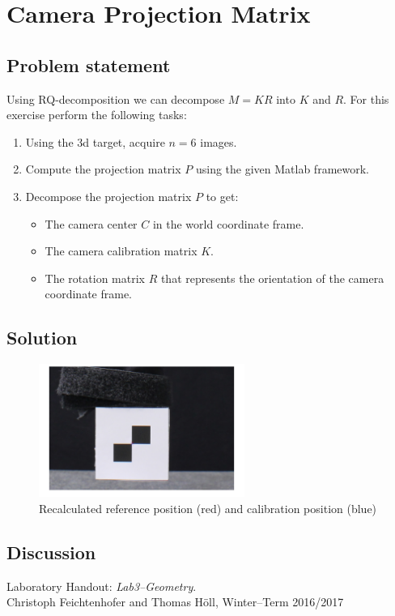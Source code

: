 \documentclass[
a4paper,     %
11pt         %
]{scrartcl}  %
\begin{document}
\FloatBarrier
\section{Camera Projection Matrix}

\subsection{Problem statement}

Using RQ-decomposition we can decompose $M = KR$ into $K$ and $R$.
For this exercise perform the following tasks:

\begin{enumerate}
 \item Using the 3d target, acquire $n = 6$ images.
 \item Compute the projection matrix $P$ using the given Matlab framework.
 \item Decompose the projection matrix $P$ to get:
 \begin{itemize}
  \item The camera center $C$ in the world coordinate frame.
  \item The camera calibration matrix $K$.
  \item The rotation matrix $R$ that represents the orientation of the camera coordinate frame.
 \end{itemize}
\end{enumerate}

\subsection{Solution}



\begin{figure}[ht]
 \centering
 \includegraphics[width=0.6\textwidth,clip,trim=10cm 5cm 15cm 15cm]{ccm_recalculated.png}
 \caption{Recalculated reference position (red) and calibration position (blue)}
 \label{fig:camPro_recalc}
\end{figure}

\subsection{Discussion}

\begin{thebibliography}{XX}
  Laboratory Handout: \textit{Lab3--Geometry}. \\
    Christoph Feichtenhofer and Thomas Höll, Winter--Term 2016/2017
\end{thebibliography}
\end{document}
